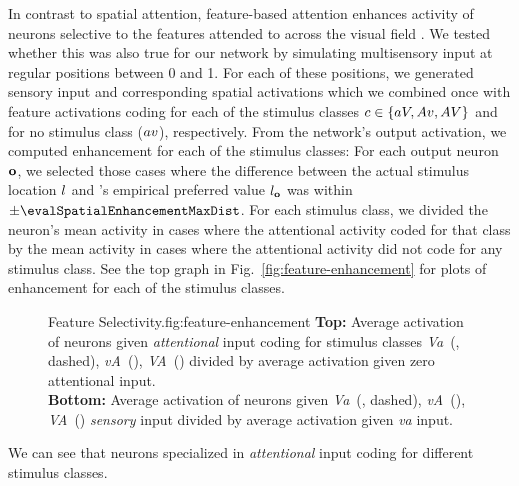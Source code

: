         In contrast to spatial attention, feature-based attention enhances activity of neurons selective to the features attended to across the visual field \citep{born-et-al-2012,maunsell-and-treue-2006}.
        We tested whether this was also true for our network by simulating multisensory input at \numStepsSpatial{} regular positions between 0 and 1.
        For each of these positions, we generated \numRepsSpatial{} sensory input and corresponding spatial activations which we combined once with feature activations coding for each of the stimulus classes  $c\in\{aV,Av,AV\}$ and for no stimulus class ($av$), respectively.
        From the network's output activation, we computed enhancement for each of the stimulus classes:
        For each output neuron $\mathbf{o}$, we selected those cases where the difference between the actual stimulus location $l$ and 's empirical preferred value $l_{\mathbf{o}}$ was within $\pm\evalSpatialEnhancementMaxDist$.
        For each stimulus class, we divided the neuron's mean activity in cases where the attentional activity coded for that class by the mean activity in cases where the attentional activity did not code for any stimulus class.
        See the top graph in Fig.~\ref{fig:feature-enhancement} for plots of enhancement for each of the stimulus classes.
        \begin{figure}
            \centering
            \begin{legend}{Feature Selectivity.}{fig:feature-enhancement}
                \textbf{Top:} Average activation of neurons given \emph{attentional} input coding for stimulus classes \textit{Va}~(, dashed), \textit{vA}~(), \textit{VA}~() divided by average activation given zero attentional input.\\
                \textbf{Bottom:} Average activation of neurons given \textit{Va}~(, dashed), \textit{vA}~(), \textit{VA}~() \emph{sensory} input divided by average activation given \textit{va} input.%
            \end{legend}
        \end{figure}
        We can see that neurons specialized in \emph{attentional} input coding for different stimulus classes.

